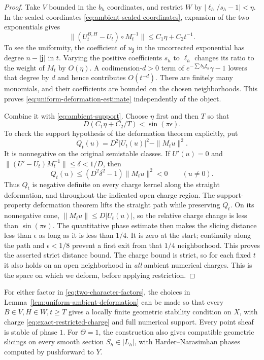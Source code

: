 \begin{proof}
Take $V$ bounded in the $b_h$ coordinates, and restrict $W$ by
$|\ell_h/s_h-1|<\eta$.  In the scaled coordinates
\eqref{eq:ambient-scaled-coordinates}, expansion of the two exponentials
gives
\begin{equation}\label{eq:uniform-deformation-estimate}
 \bigl\|(U_t^{B,H}-U_t)\circ M_t^{-1}\bigr\|
       \le C_1\eta+C_2t^{-1}.
\end{equation}
To see the uniformity, the coefficient of $u_{\mathbf j}$ in the
uncorrected exponential has degree $n-|\mathbf j|$ in $t$.  Varying the
positive coefficients $s_h$ to $\ell_h$ changes its ratio to the weight of
$M_t$ by $O(\eta)$.  A codimension-$d>0$ term of
$e^{-\sum b_h\xi_h}\gamma-1$ lowers that degree by $d$ and hence contributes
$O(t^{-d})$.  There are finitely many monomials, and their coefficients are
bounded on the chosen neighborhoods.  This proves
\eqref{eq:uniform-deformation-estimate} independently of the object.

Combine it with \eqref{eq:ambient-support}.  Choose $\eta$ first and then
$T$ so that
\[
 D(C_1\eta+C_2/T)<\sin(\pi\epsilon).
\]
To check the support hypothesis of the deformation theorem explicitly, put
\[
 Q_t(u)=D^2|U_t(u)|^2-\|M_tu\|^2.
\]
It is nonnegative on the original semistable classes.  If $U'(u)=0$ and
$\|(U'-U_t)M_t^{-1}\|\le\delta<1/D$, then
\[
 Q_t(u)\le(D^2\delta^2-1)\|M_tu\|^2<0\qquad(u\ne0).
\]
Thus $Q_t$ is negative definite on every charge kernel along the straight
deformation, and throughout the indicated open charge region.
The support-property deformation theorem
\cite[Theorem~1.2]{BayerDeformation2019} lifts the straight path while
preserving $Q_t$.  On its nonnegative cone,
$\|M_tu\|\le D|U_t(u)|$, so the relative charge change is less than
$\sin(\pi\epsilon)$.  The quantitative phase estimate
\cite[Lemma~2.9]{BayerDeformation2019} then makes the slicing distance
less than $\epsilon$ as long as it is less than $1/4$.  It is zero at the start;
continuity along the path and $\epsilon<1/8$ prevent a first exit from
that $1/4$ neighborhood.  This proves the asserted strict distance bound.
The charge bound is strict, so for each fixed $t$ it also holds on an open
neighborhood in \emph{all} ambient numerical charges.  This is the space
on which we deform, before applying restriction.
\end{proof}

\begin{proposition}\label{prop:geometric-prescribed-charges}
For either factor in \eqref{eq:two-character-factors}, the choices in
Lemma~\ref{lem:uniform-ambient-deformation} can be made so that every
$B\in V,H\in W,t\ge T$ gives a locally finite geometric stability
condition on $X$, with charge \eqref{eq:exact-restricted-charge} and full
numerical support.  Every point sheaf is stable of phase $1$.
For $\Theta=1$, the construction also gives compatible geometric slicings
on every smooth section $S_h\in|L_h|$, with Harder--Narasimhan phases
computed by pushforward to $Y$.
\end{proposition}

